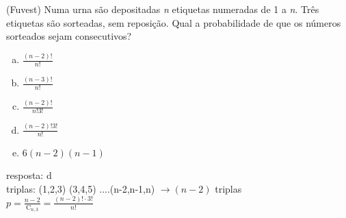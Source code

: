 \begin{ex}
 (Fuvest) Numa urna são depositadas \textit{n} etiquetas numeradas de 1 a \textit{n}. Três etiquetas são sorteadas, sem reposição. Qual a probabilidade de que os números sorteados sejam consecutivos?
    \begin{enumerate}[(a)]
    \item $\frac{(n-2)!}{n!}$
    \item $\frac{(n-3)!}{n!}$
    \item $\frac{(n-2)!}{n!3!}$
    \item $\frac{(n-2)!3!}{n!}$
    \item $6(n-2)(n-1)$
    \end{enumerate}
      \begin{sol}
       resposta: d \\
        triplas: (1,2,3) (3,4,5) ....(n-2,n-1,n) $\longrightarrow (n-2) $ triplas \\
        $p=\frac{n-2}{\mathrm{C}_{n,3}}= \frac{(n-2)!\cdot3!}{n!}$ 
        
      \end{sol}
\end{ex}